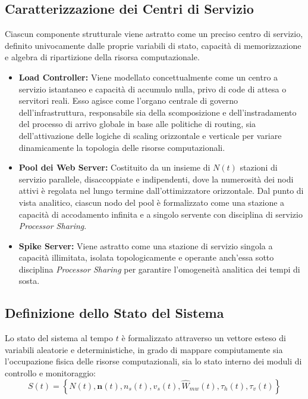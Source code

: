 ﻿\documentclass[a4paper,12pt]{article}
\begin{document}
\subsection{Caratterizzazione dei Centri di Servizio}
Ciascun componente strutturale viene astratto come un preciso centro di servizio, definito univocamente dalle proprie variabili di stato, capacità di memorizzazione e algebra di ripartizione della risorsa computazionale.

\begin{itemize}
    \item \textbf{Load Controller:} Viene modellato concettualmente come un centro a servizio istantaneo e capacità di accumulo nulla, privo di code di attesa o servitori reali. Esso agisce come l'organo centrale di governo dell'infrastruttura, responsabile sia della scomposizione e dell'instradamento del processo di arrivo globale in base alle politiche di routing, sia dell'attivazione delle logiche di scaling orizzontale e verticale per variare dinamicamente la topologia delle risorse computazionali.

    \item \textbf{Pool dei Web Server:} Costituito da un insieme di $N(t)$ stazioni di servizio parallele, disaccoppiate e indipendenti, dove la numerosità dei nodi attivi è regolata nel lungo termine dall'ottimizzatore orizzontale. Dal punto di vista analitico, ciascun nodo del pool è formalizzato come una stazione a capacità di accodamento infinita e a singolo servente con disciplina di servizio \textit{Processor Sharing}.

    \item \textbf{Spike Server:} Viene astratto come una stazione di servizio singola a capacità illimitata, isolata topologicamente e operante anch'essa sotto disciplina \textit{Processor Sharing} per garantire l'omogeneità analitica dei tempi di sosta.
\end{itemize}


\subsection{Definizione dello Stato del Sistema}
Lo stato del sistema al tempo $t$ è formalizzato attraverso un vettore esteso di variabili aleatorie e deterministiche, in grado di mappare compiutamente sia l'occupazione fisica delle risorse computazionali, sia lo stato interno dei moduli di controllo e monitoraggio:
\begin{equation}
    S(t) = \left\{ N(t), \mathbf{n}(t), n_s(t), v_s(t), \hat{W}_{mw}(t), \tau_h(t), \tau_v(t) \right\}
\end{equation}
\end{document}

